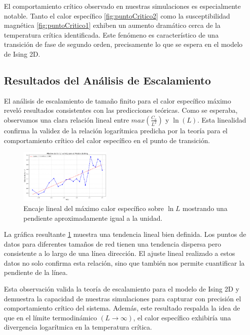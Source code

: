\documentclass[twocolumn]{article}
\begin{document}
El comportamiento crítico observado en nuestras simulaciones es especialmente notable. Tanto el calor específico \ref{fig:puntoCritico2} como la susceptibilidad magnética \ref{fig:puntoCritico1} exhiben un aumento dramático cerca de la temperatura crítica identificada. Este fenómeno es característico de una transición de fase de segundo orden, precisamente lo que se espera en el modelo de Ising 2D. 

\subsection*{Resultados del Análisis de Escalamiento}

El análisis de escalamiento de tamaño finito para el calor específico máximo reveló resultados consistentes con las predicciones teóricas. Como se esperaba, observamos una clara relación lineal entre $max(\frac{C_v}{L^2})$ y $\ln(L)$. Esta linealidad confirma la validez de la relación logarítmica predicha por la teoría para el comportamiento crítico del calor específico en el punto de transición.


\begin{figure}[hbt]
    \centering
    \includegraphics[width=0.4\textwidth]{figures/cv_sobre_logL.png}
    \caption{Encaje lineal del máximo calor específico sobre $\ln L$ mostrando una pendiente aproximadamente igual a la unidad.}
    \label{fig:cvSobreLogL}
\end{figure}


La gráfica resultante \ref{fig:cvSobreLogL} muestra una tendencia lineal bien definida. Los puntos de datos para diferentes tamaños de red tienen una tendencia dispersa pero consistente a lo largo de una línea dirección. El ajuste lineal realizado a estos datos no solo confirma esta relación, sino que también nos permite cuantificar la pendiente de la línea.

Esta observación valida la teoría de escalamiento para el modelo de Ising 2D y demuestra la capacidad de nuestras simulaciones para capturar con precisión el comportamiento crítico del sistema. Además, este resultado respalda la idea de que en el límite termodinámico $(L \to \infty)$, el calor específico exhibiría una divergencia logarítmica en la temperatura crítica.
\end{document}
